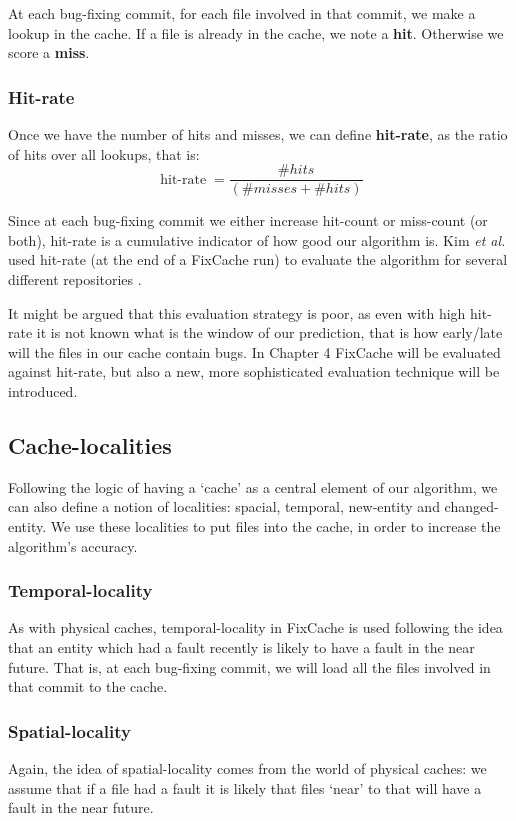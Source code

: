 \documentclass[12pt,twoside,notitlepage]{report}
\newcommand{\fxch}{FixCache}
\newcommand{\etal}{\textit{et al.}}
\begin{document}
At each bug-fixing commit, for each file involved in that commit, we make a lookup in the cache. If a file is already in the cache, we note a \textbf{hit}. Otherwise we score a \textbf{miss}.
\subsubsection*{Hit-rate}
Once we have the number of hits and misses, we can define \textbf{hit-rate}, as the ratio of hits over all lookups, that is:
\vspace{0.2in}
\[
	\operatorname{hit-rate} = \frac{\#hits}{(\#misses + \#hits)}
\]

\vspace{0.2in}

Since at each bug-fixing commit we either increase hit-count or miss-count (or both), hit-rate is a cumulative indicator of how good our algorithm is. Kim \etal{} used hit-rate (at the end of a \fxch{} run) to evaluate the algorithm for several different repositories \cite{FixCache}.

It might be argued that this evaluation strategy is poor, as even with high hit-rate it is not known what is the window of our prediction, that is how early/late will the files in our cache contain bugs. In Chapter 4 \fxch{} will be evaluated against hit-rate, but also a new, more sophisticated evaluation technique will be introduced.
\subsection{Cache-localities}
Following the logic of having a `cache' as a central element of our algorithm, we can also define a notion of localities: spacial, temporal, new-entity and changed-entity. We use these localities to put files into the cache, in order to increase the algorithm's accuracy.
\subsubsection{Temporal-locality}
As with physical caches, temporal-locality in \fxch{} is used following the idea that an entity which had a fault recently is likely to have a fault in the near future. That is, at each bug-fixing commit, we will load all the files involved in that commit to the cache.
\subsubsection{Spatial-locality}
Again, the idea of spatial-locality comes from the world of physical caches: we assume that if a file had a fault it is likely that files `near' to that will have a fault in the near future.
\end{document}
